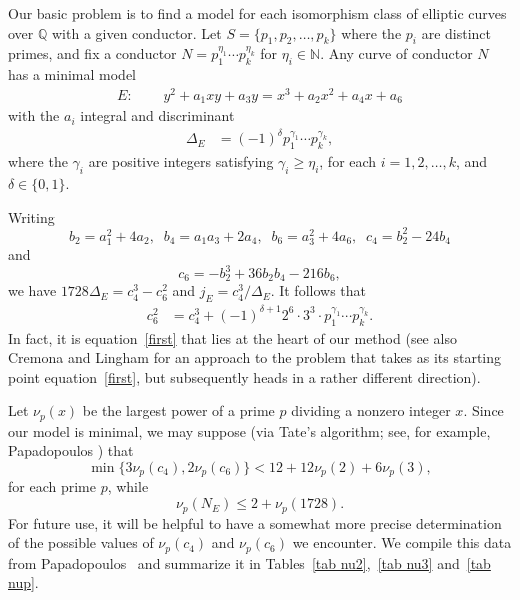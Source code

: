 \documentclass[11pt]{report}
\theoremstyle{definition}
\begin{document}
Our basic problem is to find a model for each isomorphism class of elliptic curves over $\mathbb{Q}$ with a given
conductor. Let $S=\{ p_1, p_2, \ldots, p_k \}$ where the $p_i$ are distinct primes, and fix a conductor $N= p_1^{\eta_1} \cdots p_k^{\eta_k}$ for
$\eta_i \in \mathbb{N}$.  Any curve of conductor $N$ has a minimal
model
\begin{align*}
E:&\phantom{=} y^2 + a_1 xy + a_3 y = x^3 + a_2 x^2 + a_4 x + a_6
\end{align*}
with the $a_i$ integral and discriminant
\begin{align*}
\Delta_E &= (-1)^\delta p_1^{\gamma_1} \cdots p_k^{\gamma_k},
\end{align*}
where the $\gamma_i$ are positive integers satisfying $\gamma_i \geq \eta_i$, for each $i = 1, 2, \ldots, k$, and $\delta \in \{ 0, 1 \}$.

Writing
$$
b_2 = a_1^2+4a_2, \; \; b_4 = a_1 a_3 + 2 a_4, \; \;
b_6 = a_3^2+4a_6, \; \;
c_4 = b_2^2-24 b_4
$$
and
$$
c_6 = -b_2^3+ 36 b_2 b_4 -216 b_6,
$$
we have
$1728 \Delta_E = c_4^3-c_6^2$ and
$j_E = c_4^3/\Delta_E$.
It follows that
\begin{align} \label{first}
c_6^2 &= c_4^3 + (-1)^{\delta +1} 2^6 \cdot 3^3 \cdot p_1^{\gamma_1} \cdots p_k^{\gamma_k}.
\end{align}
In fact, it is equation~\eqref{first} that lies at the heart of our method (see also Cremona and
Lingham \cite{CrLi} for an approach to the problem that takes as its starting point equation~\eqref{first}, but
subsequently heads in a rather different direction).

Let $\nu_p(x)$ be the largest power of a prime $p$ dividing a nonzero integer $x$. Since our model is minimal, we
may suppose  (via Tate's algorithm; see, for example, Papadopoulos \cite{Pap}) that
$$
\min \{ 3 \nu_p (c_4), 2 \nu_p (c_6) \} < 12 + 12 \nu_p(2) + 6 \nu_p(3),
$$
for each prime $p$, while
$$
\nu_p (N_E) \leq 2 + \nu_p (1728).
$$
For future use, it will be helpful to have a somewhat more precise determination of the possible
values of $\nu_p(c_4)$ and $\nu_p(c_6)$ we encounter. We compile this data from Papadopoulos~\cite{Pap} and
summarize it in Tables~\ref{tab nu2},~\ref{tab nu3} and~\ref{tab nup}.
\end{document}
